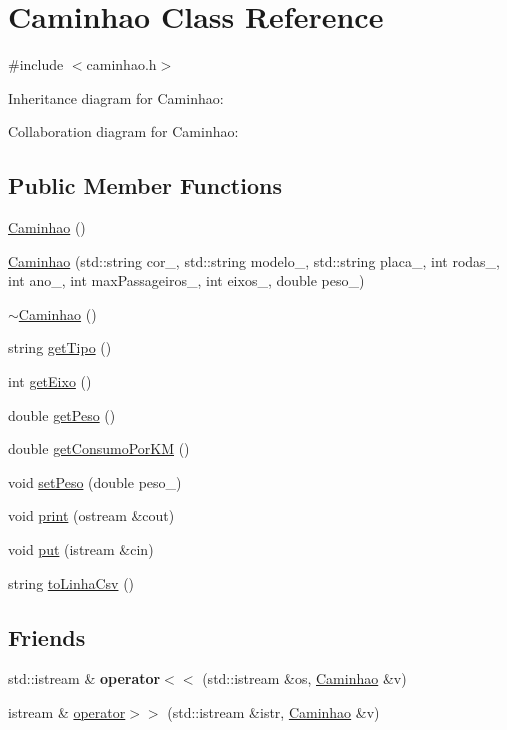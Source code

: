 \hypertarget{classCaminhao}{}\section{Caminhao Class Reference}
\label{classCaminhao}


{\ttfamily \#include $<$caminhao.\+h$>$}



Inheritance diagram for Caminhao\+:


Collaboration diagram for Caminhao\+:
\subsection*{Public Member Functions}
\begin{DoxyCompactItemize}
\item 
\hyperlink{classCaminhao_ae2621d6abfa0d9be4c3e3d6ae44a8b88}{Caminhao} ()
\item 
\hyperlink{classCaminhao_af3cdf63c2b7ff42d61649b1fdb4b540b}{Caminhao} (std\+::string cor\+\_\+, std\+::string modelo\+\_\+, std\+::string placa\+\_\+, int rodas\+\_\+, int ano\+\_\+, int max\+Passageiros\+\_\+, int eixos\+\_\+, double peso\+\_\+)
\item 
\hyperlink{classCaminhao_acb8ab61e39d44e1a0e83d2810582ddee}{$\sim$\+Caminhao} ()
\item 
string \hyperlink{classCaminhao_aa1d2138301b0c5c8c2e022309ab55bc0}{get\+Tipo} ()
\item 
int \hyperlink{classCaminhao_a2f23320651bb9eacb11ac5b260241456}{get\+Eixo} ()
\item 
double \hyperlink{classCaminhao_a309d69ad26e53f1d704a2878b2c7b17a}{get\+Peso} ()
\item 
double \hyperlink{classCaminhao_a11f7d61727617ffe237ad62ce1ac18ed}{get\+Consumo\+Por\+KM} ()
\item 
void \hyperlink{classCaminhao_a744ca750962ca3fbabe6caeb2ccd7e02}{set\+Peso} (double peso\+\_\+)
\item 
void \hyperlink{classCaminhao_a5ba8b7a769a300b10595a4aa55ccbf8c}{print} (ostream \&cout)
\item 
void \hyperlink{classCaminhao_a80131907cd5b7ef1d138e70dba4b0c0d}{put} (istream \&cin)
\item 
string \hyperlink{classCaminhao_aabcf701d339872da35d7a2948b474ec3}{to\+Linha\+Csv} ()
\end{DoxyCompactItemize}
\subsection*{Friends}
\begin{DoxyCompactItemize}
\item 
\mbox{\label{classCaminhao_ae8288029cdfcdc28216d83e8f5ea2a6d}} 
std\+::istream \& {\bfseries operator$<$$<$} (std\+::istream \&os, \hyperlink{classCaminhao}{Caminhao} \&v)
\item 
istream \& \hyperlink{classCaminhao_a8b4c2cf9aa77fc48a4c2b68bd052b512}{operator$>$$>$} (std\+::istream \&istr, \hyperlink{classCaminhao}{Caminhao} \&v)
\end{DoxyCompactItemize}
